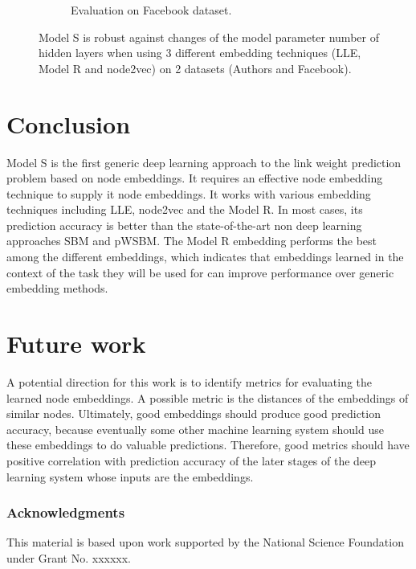 \documentclass{article} %
\begin{document}
\begin{figure}[h]
\begin{subfigure}{0.49 \linewidth}
		\caption{Evaluation on Facebook dataset.}
		\label{fig:movieLens1M}
	\end{subfigure}
	\caption{
		Model S is robust against changes of the model parameter number of hidden layers when using 3 different embedding techniques (LLE, Model R and node2vec) on 2 datasets (Authors and Facebook).
	}
	\label{fig:robust}
\end{figure}

\section{Conclusion}
Model S is the first generic deep learning approach to the link weight prediction problem based on node embeddings.
It requires an effective node embedding technique to supply it node embeddings.
It works with various embedding techniques including
LLE, node2vec and the Model R.
In most cases, its prediction accuracy is better than the state-of-the-art non deep learning approaches SBM and pWSBM.
The Model R embedding performs the best among the different embeddings, which indicates that embeddings learned in the context of the task they will be used for can improve performance over generic embedding methods.

\section{Future work}
A potential direction for this work is to identify metrics for evaluating the learned node embeddings.
A possible metric is the distances of the embeddings of similar nodes.
Ultimately, good embeddings should produce good prediction accuracy,
because eventually some other machine learning system should use these embeddings to do valuable predictions.
Therefore, good metrics should have positive correlation with prediction accuracy of the later stages of the deep learning system whose inputs are the embeddings.

\subsubsection*{Acknowledgments}
This material is based upon work supported by the National Science Foundation under Grant No. xxxxxx.



\end{document}
